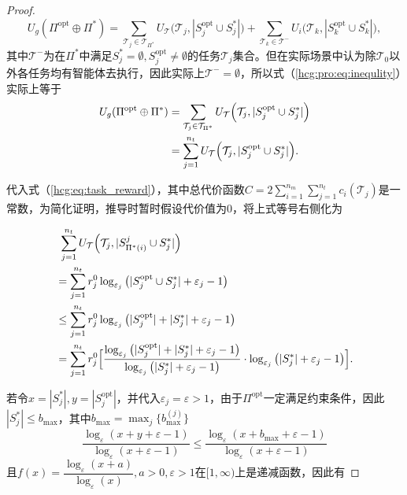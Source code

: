 \begin{proposition}
\begin{proof}
		\begin{equation}
		\label{hcg:pro:eq:inequlity}
			U_g(\Pi^{\text{opt}} \oplus \Pi^*) = \sum_{\mathcal{T}_j \in \mathcal{T}_{\Pi^*}} U_{\mathcal{T}} \Big(\mathcal{T}_j, |S_j^{\text{opt}} \cup S_j^*|\Big) + \sum_{\mathcal{T}_k \in \mathcal{T}^-} U_i\Big(\mathcal{T}_k, |S_k^{\text{opt}} \cup S_k^*|\Big),
		\end{equation}
		其中$\mathcal{T}^-$为在$\Pi^*$中满足$S_j^* = \emptyset, S_j^{\text{opt}} \neq \emptyset$的任务$\mathcal{T}_j$集合。但在实际场景中认为除$\mathcal{T}_0$以外各任务均有智能体去执行，因此实际上$\mathcal{T}^- = \emptyset$，所以式（\ref{hcg:pro:eq:inequlity}）实际上等于
		\begin{align}
			U_g(\Pi^{\text{opt}} \oplus \Pi^*) &= \sum_{\mathcal{T}_j \in \mathcal{T}_{\Pi^*}} U_{\mathcal{T}} \Big(\mathcal{T}_j, |S_j^{\text{opt}} \cup S_j^*|\Big)\notag\\
			&= \sum_{j=1}^{n_t} U_{\mathcal{T}} \Big(\mathcal{T}_j, |S_j^{\text{opt}} \cup S_j^*|\Big).
		\end{align}
			
		 代入式（\ref{hcg:eq:task_reward}），其中总代价函数$C=2\sum_{i=1}^{n_m} \sum_{j=1}^{n_t} c_i(\mathcal{T}_j)$是一常数，为简化证明，推导时暂时假设代价值为0，将上式等号右侧化为
		
		\begin{align}
			&\ \sum_{j=1}^{n_t} U_{\mathcal{T}}\Big(\mathcal{T}_j,|S_{\Pi^*(i)}^j \cup S_j^*|\Big)\notag\\
			&= \sum_{j=1}^{n_t} r_j^0 \log_{\varepsilon_j} \big(|S_j^{\text{opt}} \cup S_j^*| + \varepsilon_j - 1\big)\notag\\
			&\leq \sum_{j=1}^{n_t} r_j^0 \log_{\varepsilon_j} \big(|S_j^{\text{opt}}| + |S_j^*| + \varepsilon_j - 1\big)\notag\\
			\label{hcg:pro:eq:expand}&= \sum_{j=1}^{n_t} r_j^0 \Big[ \frac{\log_{\varepsilon_j} \big(|S_j^{\text{opt}}| + |S_j^*| + \varepsilon_j - 1\big)}{\log_{\varepsilon_j}\big(|S_j^*|+ \varepsilon_j - 1\big)} \cdot \log_{\varepsilon_j}\big(|S_j^*|+ \varepsilon_j - 1\big)\Big].
		\end{align}
		
		若令$x=|S_j^*|,y=|S_j^{\text{opt}}|$，并代入$\varepsilon_j = \varepsilon>1$，由于$\Pi^{\text{opt}}$一定满足约束条件，因此$|S_j^*| \leq b_{\text{max}}$，其中$b_{\text{max}} = \max_j\{b_{\text{max}}^{(j)}\}$
		\begin{equation}
			\frac{\log_{\varepsilon}(x+y+\varepsilon-1)}{\log_{\varepsilon}(x+\varepsilon-1)} \leq \frac{\log_{\varepsilon}(x+b_{\text{max}}+\varepsilon-1)}{\log_{\varepsilon}(x+\varepsilon-1)}
		\end{equation}
		且$f(x)=\dfrac{\log_{\varepsilon}(x+a)}{\log_{\varepsilon}(x)},a>0, \varepsilon>1$在$[1,\infty)$上是递减函数，因此有
		

\end{proof}
\end{proposition}
